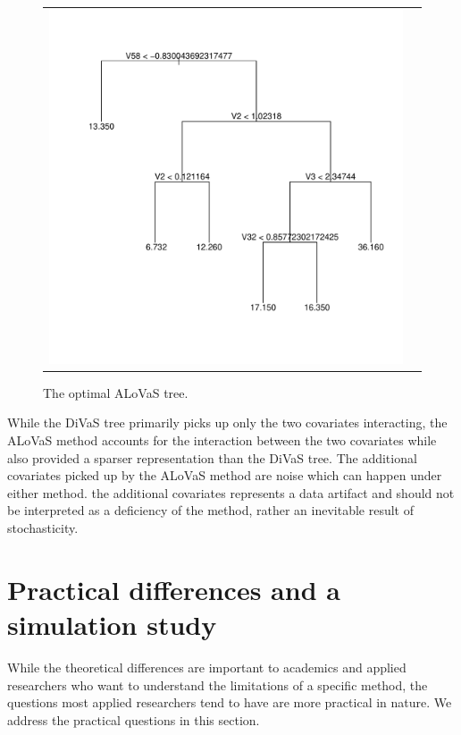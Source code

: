 \begin{figure}
\begin{center} 
\begin{tabular}{cc}
\includegraphics[scale=0.5]{figures/lasso_compare_tree.pdf}
\end{tabular}
\caption{The optimal ALoVaS tree.}
\label{fig:chain_max_interaction_tree}
\end{center}
\end{figure} 

While the DiVaS tree primarily picks up only the two covariates interacting, the ALoVaS method accounts for the interaction between the two covariates while also provided a sparser representation than the DiVaS tree. The additional covariates picked up by the ALoVaS method are noise which can happen under either method.  the additional covariates represents a data artifact and should not be interpreted as a deficiency of the method, rather an inevitable result of stochasticity. 
\section{Practical differences and a simulation study}

While the theoretical differences are important to academics and applied researchers who want to understand the limitations of a specific method, the questions most applied researchers tend to have are more practical in nature. We address the practical questions in this section. 


